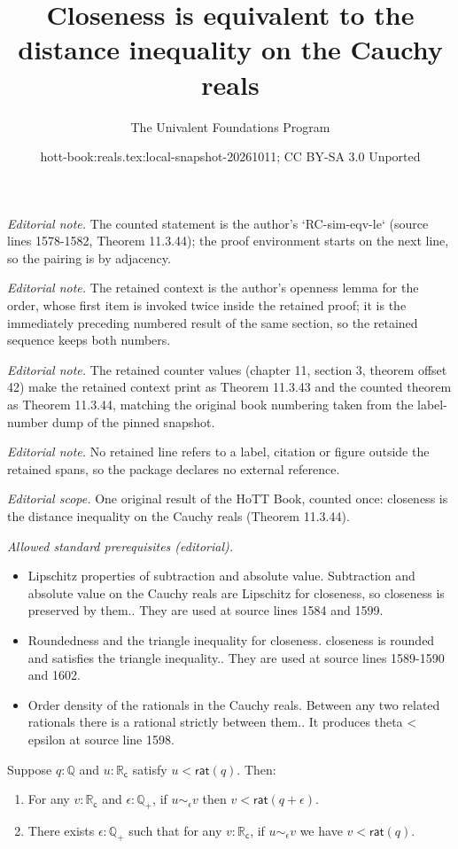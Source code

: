 \documentclass[10pt,a4paper]{article}
\title{Closeness is equivalent to the distance inequality on the Cauchy reals}
\author{The Univalent Foundations Program}
\date{hott-book:reals.tex:local-snapshot-20261011; CC BY-SA 3.0 Unported}
\newcounter{chapter}
\newcommand{\Q}{\ensuremath{\mathbb{Q}}\xspace}
\newcommand{\RC}{\ensuremath{\mathbb{R}_\mathsf{c}}\xspace} %
\newcommand{\close}[1]{\sim_{#1}} %
\newcommand{\rcrat}{\mathsf{rat}} %
\newcommand{\Qp}{\Q_{+}}
\theoremstyle{definition}
\theoremstyle{remark}
\numberwithin{equation}{section}
\begin{document}
\maketitle
\setcounter{chapter}{11}
\setcounter{section}{3}
\setcounter{thm}{42}
\noindent\textit{Editorial note.} The counted statement is the author's `RC-sim-eqv-le` (source lines 1578-1582, Theorem 11.3.44); the proof environment starts on the next line, so the pairing is by adjacency.\par\medskip
\noindent\textit{Editorial note.} The retained context is the author's openness lemma for the order, whose first item is invoked twice inside the retained proof; it is the immediately preceding numbered result of the same section, so the retained sequence keeps both numbers.\par\medskip
\noindent\textit{Editorial note.} The retained counter values (chapter 11, section 3, theorem offset 42) make the retained context print as Theorem 11.3.43 and the counted theorem as Theorem 11.3.44, matching the original book numbering taken from the label-number dump of the pinned snapshot.\par\medskip
\noindent\textit{Editorial note.} No retained line refers to a label, citation or figure outside the retained spans, so the package declares no external reference.\par\medskip
\noindent\textit{Editorial scope.} One original result of the HoTT Book, counted once: closeness is the distance inequality on the Cauchy reals (Theorem 11.3.44).\par\medskip
\noindent\textit{Allowed standard prerequisites (editorial).}\begin{itemize}
\item Lipschitz properties of subtraction and absolute value. Subtraction and absolute value on the Cauchy reals are Lipschitz for closeness, so closeness is preserved by them.. They are used at source lines 1584 and 1599.
\item Roundedness and the triangle inequality for closeness. closeness is rounded and satisfies the triangle inequality.. They are used at source lines 1589-1590 and 1602.
\item Order density of the rationals in the Cauchy reals. Between any two related rationals there is a rational strictly between them.. It produces theta < epsilon at source line 1598.
\end{itemize}\medskip
\begin{lem}\label{thm:RC-lt-open}
  Suppose $q:\Q$ and $u:\RC$ satisfy $u<\rcrat(q)$.  Then:
  \begin{enumerate}
  \item For any $v:\RC$ and $\epsilon:\Qp$, if $u\close\epsilon v$ then $v< \rcrat(q+\epsilon)$.\label{item:RCltopen1}
  \item There exists $\epsilon:\Qp$ such that for any $v:\RC$, if $u\close\epsilon v$ we have $v<\rcrat(q)$.\label{item:RCltopen2}
  \end{enumerate}
\end{lem}
\end{document}
